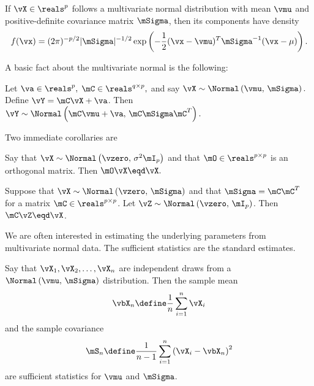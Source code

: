 \begin{proposition}
If $\vX \in \reals^p$ follows a multivariate normal distribution with mean $\vmu$ and positive-definite covariance matrix $\mSigma$, then its components have density
\begin{equation}\label{E:normal-density}
    f( \vx )
    =
    (2 \pi )^{-p/2}
    |\mSigma|^{-1/2}
    \exp\left(
        -
        \frac{1}{2}
        (\vx - \vmu)^T
        \mSigma^{-1}
        (\vx - \mu)
    \right).
\end{equation}
\end{proposition}

A basic fact about the multivariate normal is the following:

\begin{proposition}\label{P:scale-shift-normal}
Let 
\(
    \va \in \reals^p,
\)
\(
    \mC \in \reals^{q \times p},
\)
and say
\(
    \vX 
    \sim
    \Normal \left( 
        \vmu, \,
        \mSigma
    \right).
\)
Define $\vY = \mC \vX + \va$.  Then 
\(
    \vY
    \sim
    \Normal \left( 
        \mC \vmu + \va, \,
        \mC \mSigma \mC^T
    \right).
\)
\end{proposition}

\noindent
Two immediate corollaries are

\begin{corollary}\label{C:normal-orthog-invariant}
Say that
\(
    \vX 
    \sim 
    \Normal \left( 
        \vzero, \,
        \sigma^2 \mI_p
    \right)
\)
and that
\(
    \mO \in \reals^{p \times p}
\)
is an orthogonal matrix.  Then
\(
    \mO \vX \eqd \vX.
\)
\end{corollary}

\begin{corollary}
Suppose that
\(
    \vX 
    \sim 
    \Normal \left( 
        \vzero, \,
        \mSigma
    \right)
\)
and that $\mSigma = \mC \mC^T$ for a matrix $\mC \in \reals^{p \times p}$.
Let 
\(
    \vZ
    \sim
    \Normal \left(
        \vzero, \,
        \mI_p
    \right)
\).
Then
\(
    \mC \vZ
    \eqd
    \vX
\).
\end{corollary}    

We are often interested in estimating the underlying parameters from
multivariate normal data.  The sufficient statistics are the standard
estimates.

\begin{proposition}\label{P:normal-sufficient-stats}
Say that
\(
    \vX_1, \vX_2, \ldots, \vX_n
\) 
are independent draws from a
\(
    \Normal \left(
        \vmu, \,
        \mSigma
    \right)
\)
distribution.  Then the sample mean
\begin{equation}\label{E:sample-mean}
    \vbX_n
    \define
    \frac{1}{n}
    \sum_{i=1}^n
        \vX_i
\end{equation}
and the sample covariance
\begin{equation}\label{E:sample-covariance}
    \mS_n
    \define
    \frac{1}{n-1}
    \sum_{i=1}^n
        \left(
            \vX_i - \vbX_n
        \right)^2
\end{equation}
are sufficient statistics for $\vmu$ and $\mSigma$.
\end{proposition}

